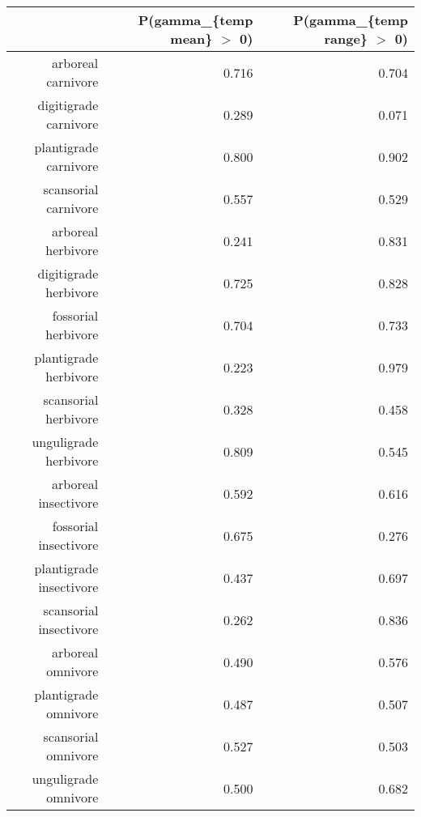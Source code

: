 \begin{table}[ht]
\centering
\begin{tabular}{rrr}
  \hline
 & P(gamma\_\{temp mean\} $>$ 0) & P(gamma\_\{temp range\} $>$ 0) \\ 
  \hline
arboreal carnivore & 0.716 & 0.704 \\ 
  digitigrade carnivore & 0.289 & 0.071 \\ 
  plantigrade carnivore & 0.800 & 0.902 \\ 
  scansorial carnivore & 0.557 & 0.529 \\ 
  arboreal herbivore & 0.241 & 0.831 \\ 
  digitigrade herbivore & 0.725 & 0.828 \\ 
  fossorial herbivore & 0.704 & 0.733 \\ 
  plantigrade herbivore & 0.223 & 0.979 \\ 
  scansorial herbivore & 0.328 & 0.458 \\ 
  unguligrade herbivore & 0.809 & 0.545 \\ 
  arboreal insectivore & 0.592 & 0.616 \\ 
  fossorial insectivore & 0.675 & 0.276 \\ 
  plantigrade insectivore & 0.437 & 0.697 \\ 
  scansorial insectivore & 0.262 & 0.836 \\ 
  arboreal omnivore & 0.490 & 0.576 \\ 
  plantigrade omnivore & 0.487 & 0.507 \\ 
  scansorial omnivore & 0.527 & 0.503 \\ 
  unguligrade omnivore & 0.500 & 0.682 \\ 
   \hline
\end{tabular}
\label{tab:surv_temp}
\end{table}
